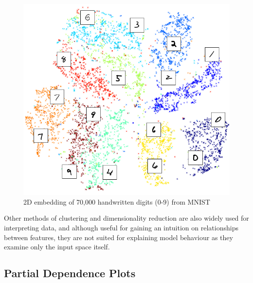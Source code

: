 \documentclass[main]{subfiles}
\begin{document}
\begin{figure}[h]
\centering
\includegraphics[scale=0.2]{tsne.png}
\caption{2D embedding of 70,000 handwritten digits (0-9) from MNIST \cite{tsne}}
\label{tsneimg}
\end{figure}

Other methods of clustering and dimensionality reduction are also widely used for interpreting data, and although useful for gaining an intuition on relationships between features, they are not suited for explaining model behaviour as they examine only the input space itself. 

\subsection{Partial Dependence Plots}
\end{document}
